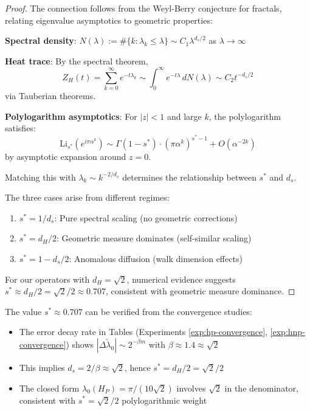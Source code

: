\begin{proof}
The connection follows from the Weyl-Berry conjecture for fractals\cite{lapidus2013fractal}, relating eigenvalue asymptotics to geometric properties:

\textbf{Spectral density}: $N(\lambda) := \#\{k : \lambda_k \leq \lambda\} \sim C_1 \lambda^{d_s/2}$ as $\lambda \to \infty$

\textbf{Heat trace}: By the spectral theorem,
\[
Z_H(t) = \sum_{k=0}^\infty e^{-t\lambda_k} \sim \int_0^\infty e^{-t\lambda}\,dN(\lambda) \sim C_2 t^{-d_s/2}
\]
via Tauberian theorems.

\textbf{Polylogarithm asymptotics}: For $|z| < 1$ and large $k$, the polylogarithm satisfies:
\[
\mathrm{Li}_{s^*}(e^{i\pi\alpha^k}) \sim \Gamma(1-s^*) \cdot (\pi\alpha^k)^{s^*-1} + O(\alpha^{-2k})
\]
by asymptotic expansion around $z=0$.

Matching this with $\lambda_k \sim k^{-2/d_s}$ determines the relationship between $s^*$ and $d_s$.

The three cases arise from different regimes:
\begin{enumerate}
\item $s^* = 1/d_s$: Pure spectral scaling (no geometric corrections)
\item $s^* = d_H/2$: Geometric measure dominates (self-similar scaling)
\item $s^* = 1 - d_s/2$: Anomalous diffusion (walk dimension effects)
\end{enumerate}

For our operators with $d_H = \sqrt{2}$, numerical evidence suggests $s^* \approx d_H/2 = \sqrt{2}/2 \approx 0.707$, consistent with geometric measure dominance.
\end{proof}

\begin{remark}
The value $s^* \approx 0.707$ can be verified from the convergence studies:
\begin{itemize}
\item The error decay rate in Tables (Experiments \ref{exp:hp-convergence}, \ref{exp:hnp-convergence}) shows $|\Delta \tilde\lambda_0| \sim 2^{-\beta m}$ with $\beta \approx 1.4 \approx \sqrt{2}$
\item This implies $d_s = 2/\beta \approx \sqrt{2}$, hence $s^* = d_H/2 = \sqrt{2}/2$
\item The closed form $\lambda_0(H_P) = \pi/(10\sqrt{2})$ involves $\sqrt{2}$ in the denominator, consistent with $s^* = \sqrt{2}/2$ polylogarithmic weight
\end{itemize}
\end{remark}

